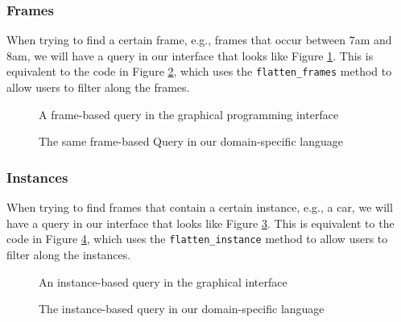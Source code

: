 \subsubsection{Frames}
When trying to find a certain frame, e.g., frames that occur between 7am and 8am, we will have a query in our interface that looks like Figure \ref{fig:Frame1}. 
This is equivalent to the code in Figure \ref{fig:Frame2}, which uses the \texttt{flatten\_frames} method to allow users to filter along the frames.

\begin{figure}[H]
    \caption{A frame-based query in the graphical programming interface}
    \label{fig:Frame1}
\end{figure}

\begin{figure}[H]
    \caption{The same frame-based Query in our domain-specific language}
    \label{fig:Frame2}
\end{figure}

\subsubsection{Instances}
When trying to find frames that contain a certain instance, e.g., a car, we will have a query in our interface that looks like Figure \ref{fig:Instance1}.
This is equivalent to the code in Figure \ref{fig:Instance2}, which uses the \texttt{flatten\_instance} method to allow users to filter along the instances.

\begin{figure}[H]
    \caption{An instance-based query in the graphical interface}
    \label{fig:Instance1}
\end{figure}

\begin{figure}[H]
    \caption{The instance-based query in our domain-specific language}
    \label{fig:Instance2}
\end{figure}

